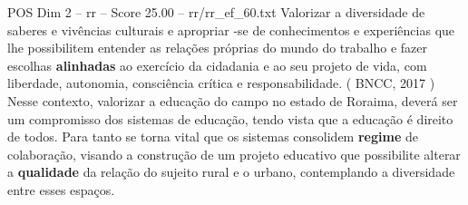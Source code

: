 \begin{textsample}{POS Dim 2 – rr – Score 25.00 – rr/rr\_ef\_60.txt}
Valorizar a diversidade de saberes e vivências culturais e apropriar -se de conhecimentos e experiências que lhe possibilitem entender as relações próprias do mundo do trabalho e fazer escolhas \textbf{alinhadas} ao exercício da cidadania e ao seu projeto de vida, com liberdade, autonomia, consciência crítica e responsabilidade. ( BNCC, 2017 ) Nesse contexto, valorizar a educação do campo no estado de Roraima, deverá ser um compromisso dos sistemas de educação, tendo vista que a educação é direito de todos.
Para tanto se torna vital que os sistemas consolidem \textbf{regime} de colaboração, visando a construção de um projeto educativo que possibilite alterar a \textbf{qualidade} da relação do sujeito rural e o urbano, contemplando a diversidade entre esses espaços.

\end{textsample}

